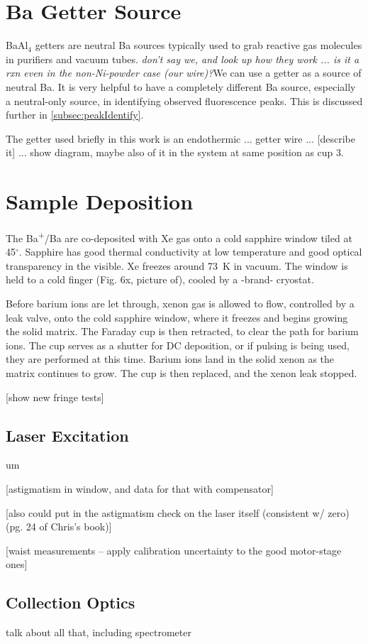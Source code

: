 \section{Ba Getter Source}

BaAl$_{4}$ getters are neutral Ba sources typically used to grab reactive gas molecules in purifiers and vacuum tubes.  \emph{\color{red}don't say we, and look up how they work ... is it a rxn even in the non-Ni-powder case (our wire)?}We can use a getter as a source of neutral Ba.  It is very helpful to have a completely different Ba source, especially a neutral-only source, in identifying observed fluorescence peaks.  This is discussed further in \ref{subsec:peakIdentify}.

The getter used briefly in this work is an endothermic ... getter wire ... {\color{gray}[describe it]} ... show diagram, maybe also of it in the system at same position as cup 3.

\section{Sample Deposition}

The Ba\textsuperscript{+}/Ba are co-deposited with Xe gas onto a cold sapphire window tiled at 45$^{\circ}$.  Sapphire has good thermal conductivity at low temperature and good optical transparency in the visible.  Xe freezes around {\color{red}73~K} in vacuum.  The window is held to a cold finger (Fig. 6x, picture of), cooled by a -brand- cryostat. %

Before barium ions are let through, xenon gas is allowed to flow, controlled by a leak valve, onto the cold sapphire window, where it freezes and begins growing the solid matrix.  The Faraday cup is then retracted, to clear the path for barium ions.  The cup serves as a shutter for DC deposition, or if pulsing is being used, they are performed at this time.  Barium ions land in the solid xenon as the matrix continues to grow.  The cup is then replaced, and the xenon leak stopped.

[show new fringe tests]

\subsection{Laser Excitation}

um

[astigmatism in window, and data for that with compensator]

[also could put in the astigmatism check on the laser itself (consistent w/ zero) (pg. 24 of Chris's book)]

[waist measurements -- apply calibration uncertainty to the good motor-stage ones]

\subsection{Collection Optics}

talk about all that, including spectrometer